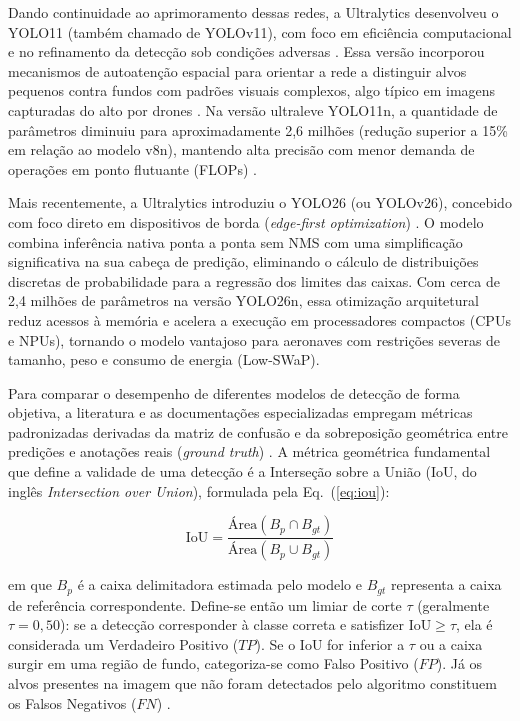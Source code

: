 Dando continuidade ao aprimoramento dessas redes, a Ultralytics desenvolveu o YOLO11 (também chamado de YOLOv11), com foco em eficiência computacional e no refinamento da detecção sob condições adversas \cite{yolo11_ultralytics}. Essa versão incorporou mecanismos de autoatenção espacial para orientar a rede a distinguir alvos pequenos contra fundos com padrões visuais complexos, algo típico em imagens capturadas do alto por drones \cite{yolo11_ultralytics, zhexebay2025}. Na versão ultraleve YOLO11n, a quantidade de parâmetros diminuiu para aproximadamente 2,6 milhões (redução superior a 15\% em relação ao modelo v8n), mantendo alta precisão com menor demanda de operações em ponto flutuante (FLOPs) \cite{yolo11_ultralytics, zhexebay2025}.

Mais recentemente, a Ultralytics introduziu o YOLO26 (ou YOLOv26), concebido com foco direto em dispositivos de borda (\textit{edge-first optimization}) \cite{yolo26_ultralytics}. O modelo combina inferência nativa ponta a ponta sem NMS com uma simplificação significativa na sua cabeça de predição, eliminando o cálculo de distribuições discretas de probabilidade para a regressão dos limites das caixas. Com cerca de 2,4 milhões de parâmetros na versão YOLO26n, essa otimização arquitetural reduz acessos à memória e acelera a execução em processadores compactos (CPUs e NPUs), tornando o modelo vantajoso para aeronaves com restrições severas de tamanho, peso e consumo de energia (Low-SWaP).

Para comparar o desempenho de diferentes modelos de detecção de forma objetiva, a literatura e as documentações especializadas empregam métricas padronizadas derivadas da matriz de confusão e da sobreposição geométrica entre predições e anotações reais (\textit{ground truth}) \cite{padilla2021, ultralytics_metrics}. A métrica geométrica fundamental que define a validade de uma detecção é a Interseção sobre a União (IoU, do inglês \textit{Intersection over Union}), formulada pela Eq.~(\ref{eq:iou}):

\begin{equation}
\text{IoU} = \frac{\text{Área}(B_p \cap B_{gt})}{\text{Área}(B_p \cup B_{gt})}
\label{eq:iou}
\end{equation}

\noindent em que $B_p$ é a caixa delimitadora estimada pelo modelo e $B_{gt}$ representa a caixa de referência correspondente. Define-se então um limiar de corte $\tau$ (geralmente $\tau = 0{,}50$): se a detecção corresponder à classe correta e satisfizer $\text{IoU} \ge \tau$, ela é considerada um Verdadeiro Positivo ($TP$). Se o IoU for inferior a $\tau$ ou a caixa surgir em uma região de fundo, categoriza-se como Falso Positivo ($FP$). Já os alvos presentes na imagem que não foram detectados pelo algoritmo constituem os Falsos Negativos ($FN$) \cite{padilla2021}.


